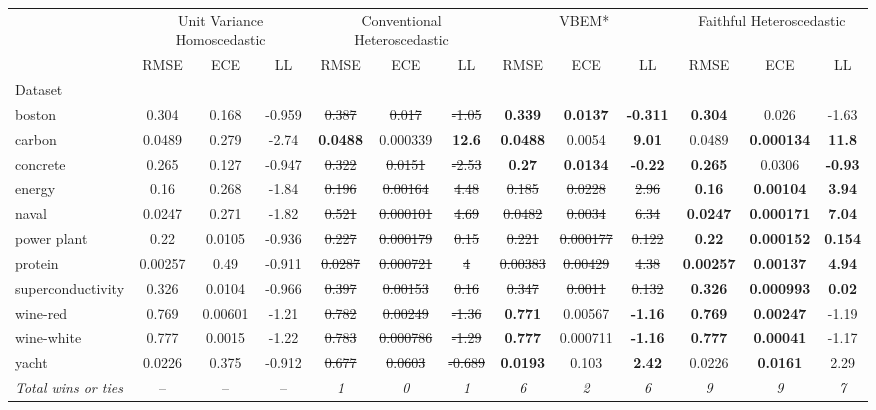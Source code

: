 \begin{tabular}{l|ccc|ccc|ccc|ccc}
\toprule
 & \multicolumn{3}{|c}{Unit Variance Homoscedastic} & \multicolumn{3}{|c}{Conventional Heteroscedastic} & \multicolumn{3}{|c}{VBEM*} & \multicolumn{3}{|c}{Faithful Heteroscedastic} \\
 & RMSE & ECE & LL & RMSE & ECE & LL & RMSE & ECE & LL & RMSE & ECE & LL \\
Dataset &  &  &  &  &  &  &  &  &  &  &  &  \\
\midrule
boston & 0.304 & 0.168 & -0.959 & \sout{0.387} & \sout{0.017} & \sout{-1.05} & \textbf{0.339} & \textbf{0.0137} & \textbf{-0.311} & \textbf{0.304} & 0.026 & -1.63 \\
carbon & 0.0489 & 0.279 & -2.74 & \textbf{0.0488} & 0.000339 & \textbf{12.6} & \textbf{0.0488} & 0.0054 & \textbf{9.01} & 0.0489 & \textbf{0.000134} & \textbf{11.8} \\
concrete & 0.265 & 0.127 & -0.947 & \sout{0.322} & \sout{0.0151} & \sout{-2.53} & \textbf{0.27} & \textbf{0.0134} & \textbf{-0.22} & \textbf{0.265} & 0.0306 & \textbf{-0.93} \\
energy & 0.16 & 0.268 & -1.84 & \sout{0.196} & \sout{0.00164} & \sout{4.48} & \sout{0.185} & \sout{0.0228} & \sout{2.96} & \textbf{0.16} & \textbf{0.00104} & \textbf{3.94} \\
naval & 0.0247 & 0.271 & -1.82 & \sout{0.521} & \sout{0.000101} & \sout{4.69} & \sout{0.0482} & \sout{0.0034} & \sout{6.34} & \textbf{0.0247} & \textbf{0.000171} & \textbf{7.04} \\
power plant & 0.22 & 0.0105 & -0.936 & \sout{0.227} & \sout{0.000179} & \sout{0.15} & \sout{0.221} & \sout{0.000177} & \sout{0.122} & \textbf{0.22} & \textbf{0.000152} & \textbf{0.154} \\
protein & 0.00257 & 0.49 & -0.911 & \sout{0.0287} & \sout{0.000721} & \sout{4} & \sout{0.00383} & \sout{0.00429} & \sout{4.38} & \textbf{0.00257} & \textbf{0.00137} & \textbf{4.94} \\
superconductivity & 0.326 & 0.0104 & -0.966 & \sout{0.397} & \sout{0.00153} & \sout{0.16} & \sout{0.347} & \sout{0.0011} & \sout{0.132} & \textbf{0.326} & \textbf{0.000993} & \textbf{0.02} \\
wine-red & 0.769 & 0.00601 & -1.21 & \sout{0.782} & \sout{0.00249} & \sout{-1.36} & \textbf{0.771} & 0.00567 & \textbf{-1.16} & \textbf{0.769} & \textbf{0.00247} & -1.19 \\
wine-white & 0.777 & 0.0015 & -1.22 & \sout{0.783} & \sout{0.000786} & \sout{-1.29} & \textbf{0.777} & 0.000711 & \textbf{-1.16} & \textbf{0.777} & \textbf{0.00041} & -1.17 \\
yacht & 0.0226 & 0.375 & -0.912 & \sout{0.677} & \sout{0.0603} & \sout{-0.689} & \textbf{0.0193} & 0.103 & \textbf{2.42} & 0.0226 & \textbf{0.0161} & 2.29 \\
\textit{{Total wins or ties}} & -- & -- & -- & \textit{1} & \textit{0} & \textit{1} & \textit{6} & \textit{2} & \textit{6} & \textit{9} & \textit{9} & \textit{7} \\
\bottomrule
\end{tabular}
